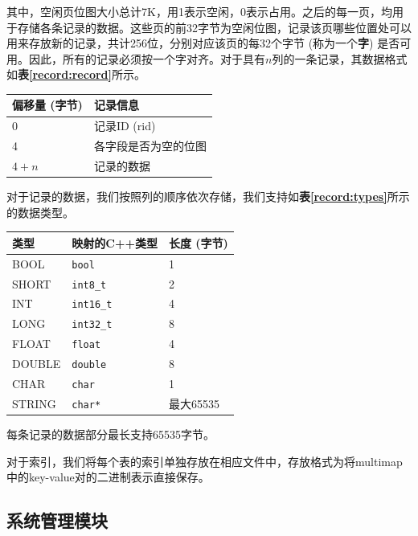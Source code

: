 \documentclass[11pt, a4paper]{article}
\makeatletter
\newcommand\tcaption{\def\@captype{table}\caption}
\newcommand{\tref}[1]{\textbf{表\ref{#1}}}
\makeatother
\begin{document}
其中，空闲页位图大小总计7K，用1表示空闲，0表示占用。之后的每一页，均用于存储各条记录的数据。这些页的前32字节为空闲位图，记录该页哪些位置处可以用来存放新的记录，共计256位，分别对应该页的每32个字节 (称为一个\textbf{字}) 是否可用。因此，所有的记录必须按一个字对齐。对于具有$n$列的一条记录，其数据格式如\tref{record:record}所示。

\begin{center}
    \tcaption{记录数据格式}\label{record:record}
    \begin{tabular}{ll}
        \toprule
        偏移量 (字节) & 记录信息 \\
        \midrule
        0 & 记录ID (rid)  \\
        4 & 各字段是否为空的位图 \\
        $4+n$ & 记录的数据 \\
        \bottomrule
    \end{tabular}
\end{center}

对于记录的数据，我们按照列的顺序依次存储，我们支持如\tref{record:types}所示的数据类型。

\begin{center}
    \tcaption{支持的数据类型}\label{record:types}
    \begin{tabular}{lll}
        \toprule
        类型 & 映射的C++类型 & 长度 (字节) \\
        \midrule
        BOOL & \texttt{bool} & 1 \\
        SHORT & \texttt{int8\_t} & 2 \\
        INT & \texttt{int16\_t} & 4 \\
        LONG & \texttt{int32\_t} & 8 \\
        FLOAT & \texttt{float} & 4 \\
        DOUBLE & \texttt{double} & 8 \\
        CHAR & \texttt{char} & 1 \\
        STRING & \texttt{char*} & 最大65535 \\
        \bottomrule
    \end{tabular}
\end{center}

每条记录的数据部分最长支持65535字节。

对于索引，我们将每个表的索引单独存放在相应文件中，存放格式为将multimap中的key-value对的二进制表示直接保存。

\subsection{系统管理模块}
\end{document}
